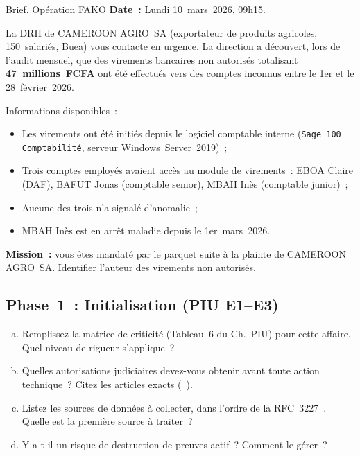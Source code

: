 \begin{boxscenario}{Brief. Opération FAKO}
\textbf{Date~:} Lundi 10~mars~2026, 09h15.

La DRH de CAMEROON AGRO~SA (exportateur de produits agricoles,
150~salariés, Buea) vous contacte en urgence. La direction a
découvert, lors de l'audit mensuel, que des virements bancaires
non autorisés totalisant \textbf{47~millions~FCFA} ont été effectués
vers des comptes inconnus entre le 1er et le 28~février~2026.

Informations disponibles~:
\begin{itemize}
    \item Les virements ont été initiés depuis le logiciel comptable
          interne (\texttt{Sage~100 Comptabilité}, serveur Windows~Server~2019)~;
    \item Trois comptes employés avaient accès au module de virements~:
          EBOA Claire (DAF), BAFUT Jonas (comptable senior),
          MBAH Inès (comptable junior)~;
    \item Aucune des trois n'a signalé d'anomalie~;
    \item MBAH Inès est en arrêt maladie depuis le 1er~mars~2026.
\end{itemize}

\textbf{Mission~:} vous êtes mandaté par le parquet suite à la plainte
de CAMEROON AGRO~SA. Identifier l'auteur des virements non autorisés.
\end{boxscenario}

\subsection{Phase~1~: Initialisation (PIU E1--E3)}

\begin{boxexo}[title={\ding{45}\quad FAKO. Étape~1~: Cadrage}]
\begin{enumerate}[(a)]
    \item Remplissez la matrice de criticité (Tableau~6 du Ch.~PIU)
          pour cette affaire. Quel niveau de rigueur s'applique~?
    \item Quelles autorisations judiciaires devez-vous obtenir
          avant toute action technique~? Citez les articles exacts
          (~\cite{cameroun2010a}).
    \item Listez les sources de données à collecter, dans l'ordre
          de la RFC~3227~\cite{rfc3227}. Quelle est la première source à traiter~?
    \item Y a-t-il un risque de destruction de preuves actif~?
          Comment le gérer~?
\end{enumerate}
\end{boxexo}

